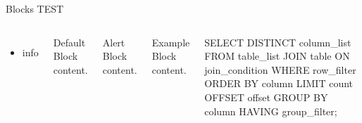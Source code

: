 \begin{frame}[fragile]{Blocks}
TEST
  \begin{columns}[T,onlytextwidth]
      \begin{itemize}
          \item info
      \end{itemize}
      
      \begin{block}{Default}
        Block content.
      \end{block}

      \begin{alertblock}{Alert}
        Block content.
      \end{alertblock}

      \begin{exampleblock}{Example}
        Block content.
      \end{exampleblock}

      \begin{greysql}
SELECT DISTINCT column_list
FROM table_list
    JOIN table ON join_condition
WHERE row_filter
ORDER BY column
LIMIT count OFFSET offset
GROUP BY column
HAVING group_filter;
\end{greysql}

  \end{columns}
\end{frame}

